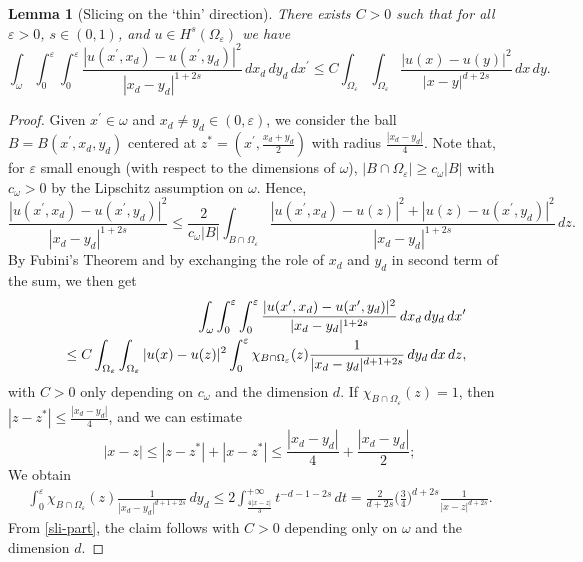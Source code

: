 \documentclass[11pt]{article}
\newtheorem{lemma}[definition]{Lemma}
\def\e{\varepsilon}
\begin{document}
\begin{lemma}[Slicing on the `thin' direction]\label{slixd} There exists $C>0$ such that for all $\e>0$, $s\in(0,1)$, and $u\in H^s(\Omega_\e)$ we have
\begin{equation}\label{slixd-eq1}
\int_\omega\int_0^\e\int_0^\e\frac{|u(x^\prime,x_d)-u(x^\prime,y_d)|^2}{|x_d-y_d|^{1+2s}}\, dx_d\, dy_d\, dx^\prime\leq C \int_{\Omega_\e}\int_{\Omega_\e} \frac{|u(x)-u(y)|^2}{|x-y|^{d+2s}}\, dx\, dy. 
\end{equation}
\end{lemma}
\begin{proof}  
Given $x^\prime\in\omega$ and $x_d\neq y_d\in(0,\e)$, we consider the ball $B=B(x^\prime,x_d,y_d)$ centered at $z^\ast=(x^\prime,\frac{x_d+y_d}{2})$ with radius $\frac{|x_d-y_d|}{4}$. 
Note that, for $\e$ small enough (with respect to the dimensions of $\omega$),  
$|B\cap\Omega_\e|\geq c_\omega|B|$ with $c_\omega>0$ by the Lipschitz assumption on $\omega$. Hence, 
$$\frac{|u(x^\prime,x_d)-u(x^\prime,y_d)|^2}{|x_d-y_d|^{1+2s}}\leq \frac{2}{c_\omega|B|}\int_{B\cap\Omega_\e} \frac{|u(x^\prime,x_d)-u(z)|^2+|u(z)-u(x^\prime,y_d)|^2}{|x_d-y_d|^{1+2s}}\, dz.$$ 
By Fubini's Theorem and by exchanging the role of $x_d$ and $y_d$ in second term of the sum, we then get 
\begin{eqnarray}\label{sli-part}
&&\hspace{-1cm}\int_\omega\int_0^\e\int_0^\e\frac{|u(x^\prime,x_d)-u(x^\prime,y_d)|^2}{|x_d-y_d|^{1+2s}}\, dx_d\, dy_d\, dx^\prime\nonumber\\
&&\leq %
C\int_{\Omega_\e}\int_{\Omega_\e}|u(x)-u(z)|^2 \int_0^\e\chi_{B\cap\Omega_\e}(z) \frac{1}{|x_d-y_d|^{d+1+2s}}\, dy_d\, dx\, dz,
\end{eqnarray}
with $C>0$ only depending on $c_\omega$ and the dimension $d$. 
If $\chi_{B\cap\Omega_\e}(z)=1$, then $|z-z^\ast|\leq \frac{|x_d-y_d|}{4}$, and we can estimate 
$$|x-z|\leq |z-z^\ast|+|x-z^\ast|\leq \frac{|x_d-y_d|}{4} +\frac{|x_d-y_d|}{2};$$ 
We obtain 
\begin{eqnarray*}
\int_0^\e\chi_{B\cap\Omega_\e}(z) \frac{1}{|x_d-y_d|^{d+1+2s}}\, dy_d \leq 2\int_{\frac{4|x-z|}{3}}^{+\infty} t^{-d-1-2s}\, dt=\frac{2}{d+2s}\Big(\frac{3}{4}\Big)^{d+2s} \frac{1}{|x-z|^{d+2s}}.
\end{eqnarray*}
From \eqref{sli-part}, the claim follows with $C>0$ depending only on $\omega$ and the dimension $d$. 
\end{proof} 
\end{document}
